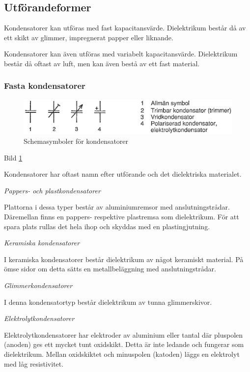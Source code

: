 \subsection{Utförandeformer}

Kondensatorer kan utföras med fast kapacitansvärde.
Dielektrikum består då av ett skikt av glimmer, impregnerat papper eller liknande.

Kondensatorer kan även utföras med variabelt kapacitansvärde.
Dielektrikum består då oftast av luft, men kan även bestå av ett fast material.

\subsubsection{Fasta kondensatorer}

\begin{figure}[ht]
\includegraphics[width=\textwidth]{images/cropped_pdfs/bild_2_2-02.pdf}
\caption{Schemasymboler för kondensatorer}
\label{fig:BildII2-2}
\end{figure}

Bild \ref{fig:BildII2-2}

Kondensatorer har oftast namn efter utförande och det dielektriska materialet.

\emph{Pappers- och plastkondensatorer}

Plattorna i dessa typer består av aluminiumremsor med anslutningstrådar.
Däremellan finns en pappers- respektive plastremsa som dielektrikum. För att
spara plats rullas det hela ihop och skyddas med en plastingjutning.

\emph{Keramiska kondensatorer}

I keramiska kondensatorer består dielektrikum av något keramiskt material.
På ömse sidor om detta sätts en metallbeläggning med anslutningstrådar.

\emph{Glimmerkondensatorer}

I denna kondensatortyp består dielektrikum av tunna glimmerskivor.

\emph{Elektrolytkondensatorer}

Elektrolytkondensatorer har elektroder av aluminium eller tantal där pluspolen
(anoden) ges ett mycket tunt oxidskikt. Detta är inte ledande och fungerar som
dielektrikum. Mellan oxidskiktet och minuspolen (katoden) läggs en elektrolyt
med låg resistivitet.

